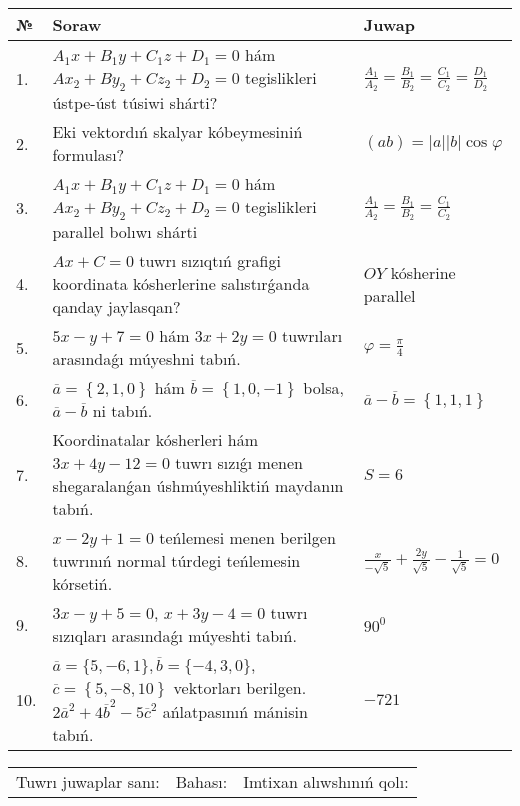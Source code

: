 \documentclass{article}
\begin{document}
\begin{tabular}{|m{0.7cm}|m{10cm}|m{4cm}|}
\hline
№ & Soraw & Juwap \\
\hline
1. & $A_1x+B_1y+C_1z+D_1=0$ hám $Ax_2+By_2+Cz_2+D_2=0$ tegislikleri ústpe-úst túsiwi shárti? & $\frac{A_1}{A_2}=\frac{B_1}{B_2}=\frac{C_1}{C_2}=\frac{D_1}{D_2}$ \\
\hline
2. & Eki vektordıń skalyar kóbeymesiniń formulası? & $(ab)=|a||b|\cos\varphi$ \\
\hline
3. & $A_1x+B_1y+C_1z+D_1=0$ hám $Ax_2+By_2+Cz_2+D_2=0$ tegislikleri parallel bolıwı shárti & $\frac{A_1}{A_2}=\frac{B_1}{B_2}=\frac{C_1}{C_2}$ \\
\hline
4. & $Ax+C=0$ tuwrı sızıqtıń grafigi koordinata kósherlerine salıstırǵanda qanday jaylasqan? & $OY$ kósherine parallel \\
\hline
5. & $5x-y+7=0$ hám $3x+2y=0$ tuwrıları arasındaǵı múyeshni tabıń. & $\varphi=\frac{\pi}{4}$ \\
\hline
6. & $\overline{a}=\left\{ 2, 1, 0 \right\}$ hám $\overline{b}=\left\{ 1, 0,-1 \right\}$ bolsa, $\overline{a}-\overline{b}$ ni tabıń. & $\overline{a} -\overline{b} = \left\{ 1,1,1 \right\}$ \\
\hline
7. & Koordinatalar kósherleri hám $ 3x+4y-12=0 $ tuwrı sızıǵı menen shegaralanǵan úshmúyeshliktiń maydanın tabıń. & $ S=6 $ \\
\hline
8. & $x-2y+1=0$ teńlemesi menen berilgen tuwrınıń normal túrdegi teńlemesin kórsetiń. & $\frac{x}{- \sqrt{5}}+\frac{2y}{\sqrt{5}}-\frac{1}{\sqrt{5}}=0$ \\
\hline
9. & $3x-y+5=0$, $x+3y-4=0$ tuwrı sızıqları arasındaǵı múyeshti tabıń. & $90^{0}$ \\
\hline
10. & $\overline{a}=\{5,-6, 1 \}, \overline{b}=\{-4, 3, 0 \} $, $\overline{c}=\left\{ 5,-8, 10 \right\}$ vektorları berilgen. $2{\overline{a}}^{2}+4{\overline{b}}^{2}-5{\overline{c}}^{2}$ ańlatpasınıń mánisin tabıń. & $-721$ \\
\hline
\end{tabular}

\vspace{1cm}

\begin{tabular}{lll}
Tuwrı juwaplar sanı: \underline{\hspace{1.5cm}} & 
Bahası: \underline{\hspace{1.5cm}} & 
Imtixan alıwshınıń qolı: \underline{\hspace{2cm}} \\
\end{tabular}
\end{document}
